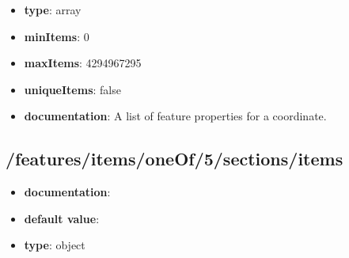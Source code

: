 \begin{itemize}\item {\bf type}: array
\item {\bf minItems}: 0
\item {\bf maxItems}: 4294967295
\item {\bf uniqueItems}: false
\item {\bf documentation}: A list of feature properties for a coordinate.
\end{itemize}\subsection{/features/items/oneOf/5/sections/items}
\begin{itemize}\item {\bf documentation}: 
\item {\bf default value}: 
\item {\bf type}: object
\end{itemize}

